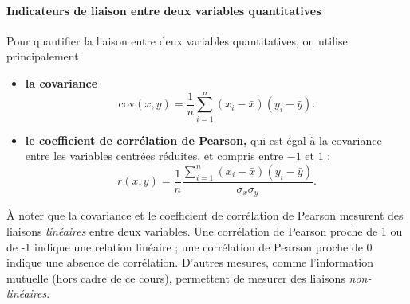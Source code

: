 \paragraph{Indicateurs de liaison entre deux variables quantitatives}
Pour quantifier la liaison entre deux variables quantitatives, on utilise
principalement
\begin{itemize}
\item \textbf{la covariance}
\[\text{cov}(x, y) = \frac1n \sum_{i=1}^n (x_i - \bar x) (y_i - \bar y).\]
\item \textbf{le coefficient de corrélation de Pearson,} qui est égal à la
  covariance entre les variables centrées réduites, et compris entre $-1$ et $1$ :
\[r(x, y) = \frac1n \frac{\sum_{i=1}^n (x_i - \bar x) (y_i - \bar y)}{\sigma_x \sigma_y}.\]
\end{itemize}

À noter que la covariance et le coefficient de corrélation de Pearson mesurent
des liaisons \textit{linéaires} entre deux variables. Une corrélation de
Pearson proche de 1 ou de -1 indique une relation linéaire ; une corrélation de
Pearson proche de 0 indique une absence de corrélation. D'autres mesures, comme
l'information mutuelle (hors cadre de ce cours), permettent de mesurer des
liaisons \textit{non-linéaires}. 

